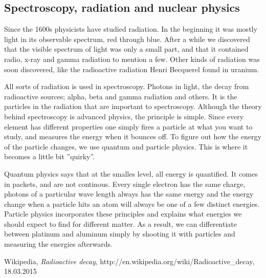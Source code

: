 \subsection*{Spectroscopy, radiation and nuclear physics}
Since the 1600s physicists have studied radiation.
In the beginning it was mostly light in its observable spectrum, red through blue.
After a while we discovered that the visible spectrum of light was only a small part, and that it contained radio, x-ray and gamma radiation to mention a few.
Other kinds of radiation was soon discovered, like the radioactive radiation Henri Becquerel \cite{First_radioactivity} found in uranium.


All sorts of radiation is used in spectroscopy. Photons in light, the decay from radioactive sources; alpha, beta and gamma radiation and others.
It is the particles in the radiation that are important to spectroscopy.
Although the theory behind spectroscopy is advanced physics, the principle is simple.
Since every element has different properties one simply fires a particle at what you want to study, and measures the energy when it bounces off.
To figure out how the energy of the particle changes, we use quantum and particle physics.
This is where it becomes a little bit ''quirky''.


Quantum physics says that at the smalles level, all energy is quantified.
It comes in packets, and are not continous.
Every single electron has the same charge, photons of a particular wave length always has the same energy and the energy change when a particle hits an atom will always be one of a few distinct energies.
Particle physics incorporates these principles and explains what energies we should expect to find for different matter.
As a result, we can differentiate between platinum and aluminum simply by shooting it with particles and measuring the energies afterwards.


	Wikipedia,
	\emph{Radioactive decay},
	http://en.wikipedia.org/wiki/Radioactive_decay,
	18.03.2015